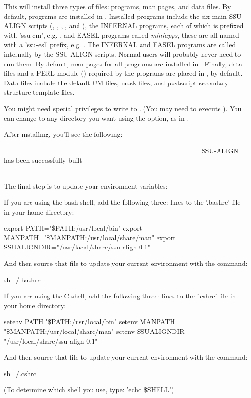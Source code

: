 
This will install three types of files: programs, man pages, and data
files.  By default, programs are installed in
. Installed programs include the six main
SSU-ALIGN scripts (, ,
, ,  and
), the INFERNAL programs, each of which is prefixed
with 'ssu-cm', e.g. , and EASEL programs
called \emph{miniapps}, these are all named with a 'ssu-esl'
prefix, e.g. . The INFERNAL and
EASEL programs are called internally by the SSU-ALIGN scripts. Normal
users will probably never need to run them.  By default, man pages for
all programs are installed in .  Finally,
data files and a PERL module () required by the programs
are placed in , by default. Data
files include the default CM files, mask files, and postscript
secondary structure template files.

You might need special privileges to write to . (You may need to execute
). You can change  to any
directory you want using the  option, as in
.

After installing, you'll see the following:

\begin{sreoutput}
=====================================
SSU-ALIGN has been successfully built
=====================================

The final step is to update your environment variables:

If you are using the bash shell, add the following three:
lines to the '.bashrc' file in your home directory:

export PATH="\$PATH:/usr/local/bin"
export MANPATH="\$MANPATH:/usr/local/share/man"
export SSUALIGNDIR="/usr/local/share/ssu-align-0.1"

And then source that file to update your current
environment with the command:

sh ~/.bashrc

If you are using the C shell, add the following three:
lines to the '.cshrc' file in your home directory:

setenv PATH "\$PATH:/usr/local/bin"
setenv MANPATH "\$MANPATH:/usr/local/share/man"
setenv SSUALIGNDIR "/usr/local/share/ssu-align-0.1"

And then source that file to update your current
environment with the command:

sh ~/.cshrc

(To determine which shell you use, type: 'echo \$SHELL')
\end{sreoutput}

